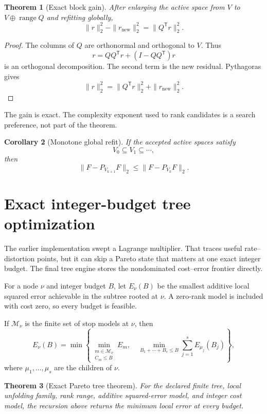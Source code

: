 \documentclass[11pt]{article}
\newtheorem{theorem}{Theorem}[section]
\newtheorem{corollary}[theorem]{Corollary}
\theoremstyle{definition}
\theoremstyle{remark}
\begin{document}
\begin{theorem}[Exact block gain]
After enlarging the active space from $V$ to $V\oplus\operatorname{range}Q$ and refitting globally,
\[
\boxed{
\|r\|_2^2-\|r_{\mathrm{new}}\|_2^2
=\|Q^{\mathsf T}r\|_2^2.
}
\]
\end{theorem}

\begin{proof}
The columns of $Q$ are orthonormal and orthogonal to $V$. Thus
\[
r=QQ^{\mathsf T}r+(I-QQ^{\mathsf T})r
\]
is an orthogonal decomposition. The second term is the new residual. Pythagoras gives
\[
\|r\|_2^2
=\|Q^{\mathsf T}r\|_2^2+
\|r_{\mathrm{new}}\|_2^2.
\]
\end{proof}

The gain is exact. The complexity exponent used to rank candidates is a search preference, not part of the theorem.

\begin{corollary}[Monotone global refit]
If the accepted active spaces satisfy
\[
V_0\subseteq V_1\subseteq\cdots,
\]
then
\[
\boxed{
\|F-P_{V_{k+1}}F\|_2
\le
\|F-P_{V_k}F\|_2.
}
\]
\end{corollary}

\section{Exact integer-budget tree optimization}
The earlier implementation swept a Lagrange multiplier. That traces useful rate--distortion points, but it can skip a Pareto state that matters at one exact integer budget. The final tree engine stores the nondominated cost--error frontier directly.

For a node $\nu$ and integer budget $B$, let $E_\nu(B)$ be the smallest additive local squared error achievable in the subtree rooted at $\nu$. A zero-rank model is included with cost zero, so every budget is feasible.

If $\mathcal M_\nu$ is the finite set of stop models at $\nu$, then
\[
\boxed{
E_\nu(B)
=
\min\left\{
\min_{\substack{m\in\mathcal M_\nu\\ C_m\le B}}E_m,
\quad
\min_{B_1+\cdots+B_s\le B}
\sum_{j=1}^{s}E_{\mu_j}(B_j)
\right\},
}
\]
where $\mu_1,\ldots,\mu_s$ are the children of $\nu$.

\begin{theorem}[Exact Pareto tree theorem]
For the declared finite tree, local unfolding family, rank range, additive squared-error model, and integer cost model, the recursion above returns the minimum local error at every budget.
\end{theorem}
\end{document}
